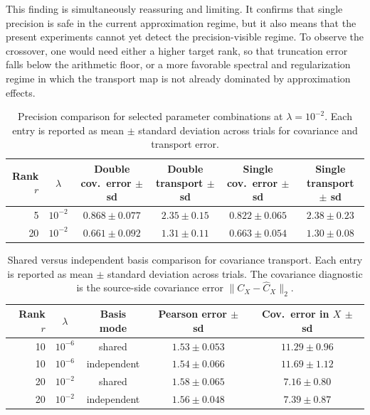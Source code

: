 This finding is simultaneously reassuring and limiting. It confirms that single precision is safe in the current approximation regime, but it also means that the present experiments cannot yet detect the precision-visible regime. To observe the crossover, one would need either a higher target rank, so that truncation error falls below the arithmetic floor, or a more favorable spectral and regularization regime in which the transport map is not already dominated by approximation effects.

\begin{table}[t]
	\centering
	\caption{Precision comparison for selected parameter combinations at \(\lambda = 10^{-2}\). Each entry is reported as mean \(\pm\) standard deviation across trials for covariance and transport error.}
	\label{tab:ct_precision}
	\begin{tabular}{rccccc}
		\toprule
		Rank \(r\) & \(\lambda\) & Double cov.\ error \(\pm\) sd & Double transport \(\pm\) sd & Single cov.\ error \(\pm\) sd & Single transport \(\pm\) sd \\
		\midrule
		5          & \(10^{-2}\) & \(0.868 \pm 0.077\)           & \(2.35 \pm 0.15\)           & \(0.822 \pm 0.065\)           & \(2.38 \pm 0.23\)           \\
		20         & \(10^{-2}\) & \(0.661 \pm 0.092\)           & \(1.31 \pm 0.11\)           & \(0.663 \pm 0.054\)           & \(1.30 \pm 0.08\)           \\
		\bottomrule
	\end{tabular}
\end{table}

\begin{table}[t]
	\centering
	\caption{Shared versus independent basis comparison for covariance transport. Each entry is reported as mean \(\pm\) standard deviation across trials. The covariance diagnostic is the source-side covariance error \(\|C_X - \widehat C_X\|_2\).}
	\label{tab:ct_basis}
	\begin{tabular}{rcccc}
		\toprule
		Rank \(r\) & \(\lambda\) & Basis mode  & Pearson error \(\pm\) sd & Cov.\ error in \(X\) \(\pm\) sd \\
		\midrule
		10         & \(10^{-6}\) & shared      & \(1.53 \pm 0.053\)       & \(11.29 \pm 0.96\)              \\
		10         & \(10^{-6}\) & independent & \(1.54 \pm 0.066\)       & \(11.69 \pm 1.12\)              \\
		\midrule
		20         & \(10^{-2}\) & shared      & \(1.58 \pm 0.065\)       & \(7.16 \pm 0.80\)               \\
		20         & \(10^{-2}\) & independent & \(1.56 \pm 0.048\)       & \(7.39 \pm 0.87\)               \\
		\bottomrule
	\end{tabular}
\end{table}

